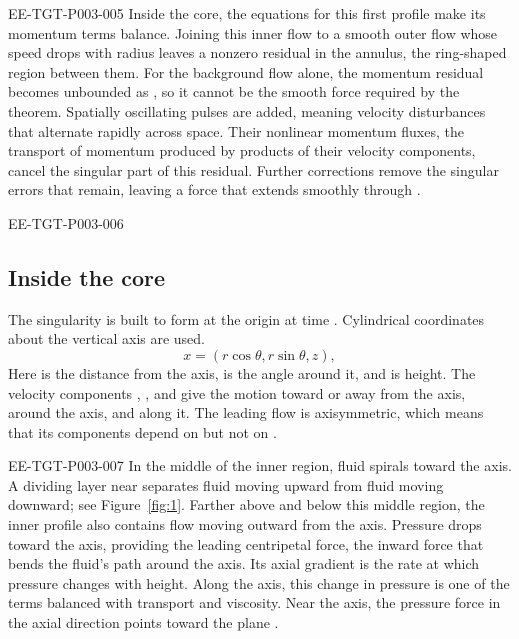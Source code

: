 \begin{EESegment}{EE-TGT-P003-005}
Inside the core, the equations for this first profile make its momentum terms balance. Joining
this inner flow to a smooth outer flow whose speed drops with radius
leaves a nonzero residual in the annulus, the ring-shaped region between them. For the
background flow alone, the momentum residual becomes unbounded as
, so it cannot be the smooth force required by the theorem.
Spatially oscillating pulses are added, meaning velocity disturbances that alternate rapidly
across space. Their nonlinear momentum fluxes, the transport of momentum produced by products
of their velocity components, cancel the singular part of this residual. Further corrections
remove the singular errors that remain, leaving a force that extends smoothly through
.
\end{EESegment}

\begin{EESegment}{EE-TGT-P003-006}
\subsection{Inside the core}\label{sec:2.1}
The singularity is built to form at the origin at time . Cylindrical
coordinates about the vertical axis are used.
\begin{equation*}
  x=(r\cos\theta,r\sin\theta,z),
\end{equation*}
Here  is the distance from the axis,
 is the angle around it, and  is height. The
velocity components , , and
 give the motion toward or away from the axis, around the axis, and
along it. The leading flow  is axisymmetric, which means that its
components depend on  but not on
.
\end{EESegment}

\begin{EESegment}{EE-TGT-P003-007}
In the middle of the inner region, fluid spirals toward the axis. A dividing layer near
 separates fluid moving upward from fluid moving downward; see
Figure~\ref{fig:1}. Farther above and below this middle region, the inner profile also contains
flow moving outward from the axis. Pressure drops toward the axis, providing the leading
centripetal force, the inward force that bends the fluid's path around the axis. Its axial
gradient is the rate at which pressure changes with height. Along the axis, this change in pressure
is one of the terms balanced with transport and viscosity. Near the axis, the pressure force in the axial direction points
toward the plane .
\end{EESegment}

